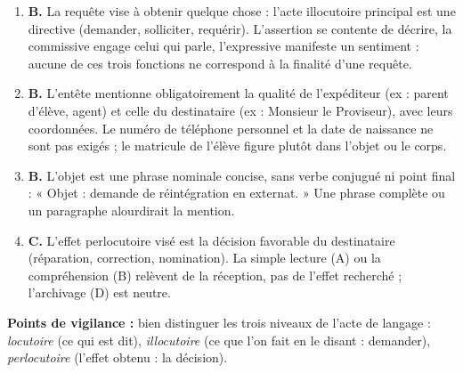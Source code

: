 \documentclass[11pt]{article}
\newcommand{\cle}[1]{{\popxbold\color{popdark}#1}}
\begin{document}
\begin{corrige}
\begin{enumerate}
    \item \textbf{B.} La requête vise à obtenir quelque chose : l'acte \cle{illocutoire} principal est une \cle{directive} (demander, solliciter, requérir). L'assertion se contente de décrire, la commissive engage celui qui parle, l'expressive manifeste un sentiment : aucune de ces trois fonctions ne correspond à la finalité d'une requête.
    \item \textbf{B.} L'entête mentionne obligatoirement la \cle{qualité} de l'expéditeur (ex : parent d'élève, agent) et celle du destinataire (ex : Monsieur le Proviseur), avec leurs coordonnées. Le numéro de téléphone personnel et la date de naissance ne sont pas exigés ; le matricule de l'élève figure plutôt dans l'objet ou le corps.
    \item \textbf{B.} L'objet est une \cle{phrase nominale} concise, sans verbe conjugué ni point final : « Objet : demande de réintégration en externat. » Une phrase complète ou un paragraphe alourdirait la mention.
    \item \textbf{C.} L'effet \cle{perlocutoire} visé est la décision favorable du destinataire (réparation, correction, nomination). La simple lecture (A) ou la compréhension (B) relèvent de la réception, pas de l'effet recherché ; l'archivage (D) est neutre.
\end{enumerate}
\textbf{Points de vigilance :} bien distinguer les trois niveaux de l'acte de langage : \emph{locutoire} (ce qui est dit), \emph{illocutoire} (ce que l'on fait en le disant : demander), \emph{perlocutoire} (l'effet obtenu : la décision).
\end{corrige}
\end{document}
